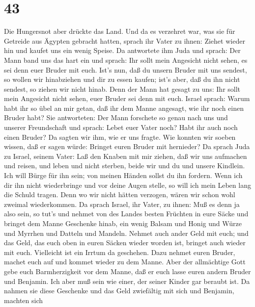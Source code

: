 \hypertarget{section-42}{%
\section{43}\label{section-42}}

 Die Hungersnot aber drückte das Land.  Und da
es verzehret war, was sie für Getreide aus Ägypten gebracht hatten,
sprach ihr Vater zu ihnen: Ziehet wieder hin und kaufet uns ein wenig
Speise.  Da antwortete ihm Juda und sprach: Der Mann band
uns das hart ein und sprach: Ihr sollt mein Angesicht nicht sehen, es
sei denn euer Bruder mit euch.  Ist's nun, daß du unsern
Bruder mit uns sendest, so wollen wir hinabziehen und dir zu essen
kaufen;  ist's aber, daß du ihn nicht sendest, so ziehen wir
nicht hinab. Denn der Mann hat gesagt zu uns: Ihr sollt mein Angesicht
nicht sehen, euer Bruder sei denn mit euch.  Israel sprach:
Warum habt ihr so übel an mir getan, daß ihr dem Manne angesagt, wie ihr
noch einen Bruder habt?  Sie antworteten: Der Mann forschete
so genau nach uns und unserer Freundschaft und sprach: Lebet euer Vater
noch? Habt ihr auch noch einen Bruder? Da sagten wir ihm, wie er uns
fragte. Wie konnten wir soeben wissen, daß er sagen würde: Bringet euren
Bruder mit hernieder?  Da sprach Juda zu Israel, seinem
Vater: Laß den Knaben mit mir ziehen, daß wir uns aufmachen und reisen,
und leben und nicht sterben, beide wir und du und unsere Kindlein.
 Ich will Bürge für ihn sein; von meinen Händen sollst du
ihn fordern. Wenn ich dir ihn nicht wiederbringe und vor deine Augen
stelle, so will ich mein Leben lang die Schuld tragen. 
Denn wo wir nicht hätten verzogen, wären wir schon wohl zweimal
wiederkommen.  Da sprach Israel, ihr Vater, zu ihnen: Muß
es denn ja also sein, so tut's und nehmet von des Landes besten Früchten
in eure Säcke und bringet dem Manne Geschenke hinab, ein wenig Balsam
und Honig und Würze und Myrrhen und Datteln und Mandeln. 
Nehmet auch ander Geld mit euch; und das Geld, das euch oben in euren
Säcken wieder worden ist, bringet auch wieder mit euch. Vielleicht ist
ein Irrtum da geschehen.  Dazu nehmet euren Bruder, machet
euch auf und kommet wieder zu dem Manne.  Aber der
allmächtige Gott gebe euch Barmherzigkeit vor dem Manne, daß er euch
lasse euren andern Bruder und Benjamin. Ich aber muß sein wie einer, der
seiner Kinder gar beraubt ist.  Da nahmen sie diese
Geschenke und das Geld zwiefältig mit sich und Benjamin, machten sich
